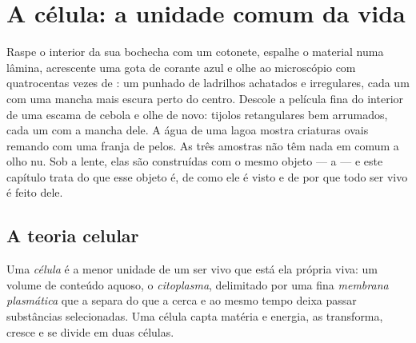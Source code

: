 \chapter{A célula: a unidade comum da vida}\label{ch:g10:cells-common-unit}

Raspe o interior da sua bochecha com um cotonete, espalhe o material
numa lâmina, acrescente uma gota de corante azul e olhe ao microscópio
com quatrocentas vezes de : um punhado de ladrilhos achatados e
irregulares, cada um com uma mancha mais escura perto do centro.
Descole a película fina do interior de uma escama de cebola e olhe de
novo: tijolos retangulares bem arrumados, cada um com a mancha dele.
A água de uma lagoa mostra criaturas ovais remando com uma franja de
pelos. As três amostras não têm nada em comum a olho nu. Sob a lente,
elas são construídas com o mesmo objeto --- a  --- e este capítulo
trata do que esse objeto é, de como ele é visto e de por que todo ser
vivo é feito dele.

\section{A teoria celular}

\begin{definition}[Célula]\label{def:g10:cells-common-unit:cell}
Uma \emph{célula} é a menor unidade de um ser vivo que
está ela própria viva: um volume de conteúdo aquoso, o
\emph{citoplasma}, delimitado por uma fina
\emph{membrana plasmática} que a separa do
que a cerca e ao mesmo tempo deixa passar substâncias selecionadas. Uma
célula capta matéria e energia, as transforma, cresce e se divide em
duas células.
\end{definition}


